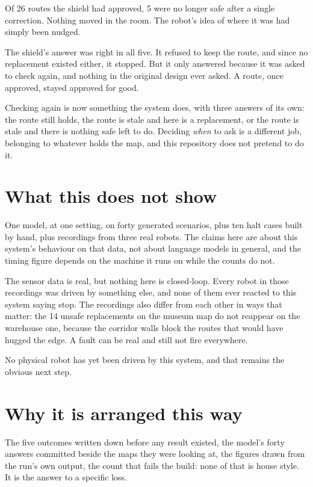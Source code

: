 \documentclass[11pt,a4paper]{article}
\begin{document}
Of 26 routes the shield had approved, 5 were no longer safe after a single correction. Nothing moved in the room. The robot's idea of where it was had simply been nudged.

The shield's answer was right in all five. It refused to keep the route, and since no replacement existed either, it stopped. But it only answered because it was asked to check again, and nothing in the original design ever asked. A route, once approved, stayed approved for good.

Checking again is now something the system does, with three answers of its own: the route still holds, the route is stale and here is a replacement, or the route is stale and there is nothing safe left to do. Deciding \emph{when} to ask is a different job, belonging to whatever holds the map, and this repository does not pretend to do it.

\section{What this does not show}

One model, at one setting, on forty generated scenarios, plus ten halt cases built by hand, plus recordings from three real robots. The claims here are about this system's behaviour on that data, not about language models in general, and the timing figure depends on the machine it runs on while the counts do not.

The sensor data is real, but nothing here is closed-loop. Every robot in those recordings was driven by something else, and none of them ever reacted to this system saying stop. The recordings also differ from each other in ways that matter: the 14 unsafe replacements on the museum map do not reappear on the warehouse one, because the corridor walls block the routes that would have hugged the edge. A fault can be real and still not fire everywhere.

No physical robot has yet been driven by this system, and that remains the obvious next step.

\section{Why it is arranged this way}

The five outcomes written down before any result existed, the model's forty answers committed beside the maps they were looking at, the figures drawn from the run's own output, the count that fails the build: none of that is house style. It is the answer to a specific loss.
\end{document}
